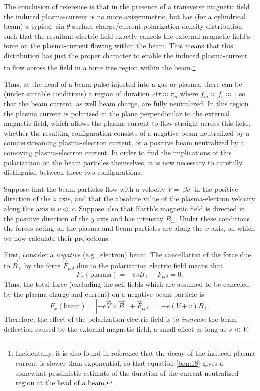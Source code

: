 \documentclass [12pt,a4paper,     ]{report} %
\begin{document}
   The conclusion of reference \cite{LEE--1971-} is that in the presence of a transverse magnetic field the induced plasma-current is no more axisymmetric, but has (for a cylindrical beam) a typical $\sin \theta$ surface charge/current polarization density distribution such that the resultant electric field exactly cancels the external magnetic field's force on the plasma-current flowing within the beam.  This means that this distribution has just the proper character to enable the induced plasma-current to flow across the field in a force free region within the beam.\footnote{Incidentally, it is also found in reference \cite{LEE--1971-} that the decay of the induced plasma current is slower than exponential, so that equation \eqref{bcn:18} gives a somewhat pessimistic estimate of the duration of the current neutralized region at the head of a beam.}

   Thus, at the head of a beam pulse injected into a gas or plasma, there can be (under suitable conditions) a region of duration $\Delta \tau \approx \tau_m$ where $f_m \approx f_e \approx 1$ so that the beam current, as well beam charge, are fully neutralized.  In this region the plasma current is polarized in the plane perpendicular to the external magnetic field, which allows the plasma current to flow straight across this field,  whether the resulting configuration consists of a negative beam neutralized by a counterstreaming plasma-electron current, or a positive beam neutralized by a comoving plasma-electron current.  In order to find the implications of this polarization on the beam particles themselves, it is now necessary to carefully distinguish between these two configurations. 

  Suppose that the beam particles flow with a velocity $V=|\beta c|$ in the positive direction of the $z$ axis, and that the absolute value of the plasma-electron velocity along this axis is $v \ll c$.  Suppose also that Earth's magnetic field is directed in the positive direction of the $y$ axis and has intensity $B_{\perp}$.  Under these conditions the forces acting on the plasma and beam particles are along the $x$ axis, on which we now calculate their projections.

    First, consider a \emph{negative} (e.g., electron) beam.  The  cancellation of the force due to $\vec{B}_{\perp}$ by the force $\vec{F}_{pol}$ due to the polarization electric field means that
%
\begin{equation}\label{mag:6} %
          F_x(\text{plasma}) = -e v  B_{\perp} +  F_{pol} = 0.
\end{equation}
%
Thus, the total force (excluding the self-fields which are assumed to be canceled by the plasma charge and current) on a negative beam particle is
%
\begin{equation}\label{mag:7} %
       F_x(\text{beam}) = |-e \vec{V} \times \vec{B}_{\perp} +  \vec{F}_{pol} ~ |
                 = +  e (V + v) B_{\perp}.
\end{equation}
%
Therefore, the effect of the polarization electric field is to \emph{increase} the beam deflection caused by the external magnetic field, a small effect as long as $v \ll V$.
\end{document}
